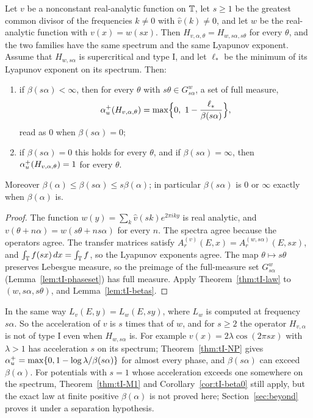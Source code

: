 \begin{theorem}[Covariance]\label{thm:tI-NP}
Let $v$ be a nonconstant real-analytic function on $\mathbb T$, let $s\ge1$ be the greatest common divisor of the frequencies $k\ne0$ with $\hat v(k)\ne0$, and let $w$ be the real-analytic function with $v(x)=w(sx)$. Then $H_{v,\alpha,\theta}=H_{w,s\alpha,s\theta}$ for every $\theta$, and the two families have the same spectrum and the same Lyapunov exponent. Assume that $H_{w,s\alpha}$ is supercritical and type I, and let $\ell_*$ be the minimum of its Lyapunov exponent on its spectrum. Then:
\begin{enumerate}
\item if $\beta(s\alpha)<\infty$, then for every $\theta$ with $s\theta\in G^w_{s\alpha}$, a set of full measure,
\[
\au(H_{v,\alpha,\theta})=\max\Bigl\{0,\ 1-\frac{\ell_*}{\beta(s\alpha)}\Bigr\},
\]
read as $0$ when $\beta(s\alpha)=0$;
\item if $\beta(s\alpha)=0$ this holds for every $\theta$, and if $\beta(s\alpha)=\infty$, then $\alpha_u^+(H_{v,\alpha,\theta})=1$ for every $\theta$.
\end{enumerate}
Moreover $\beta(\alpha)\le\beta(s\alpha)\le s\beta(\alpha)$; in particular $\beta(s\alpha)$ is $0$ or $\infty$ exactly when $\beta(\alpha)$ is.
\end{theorem}

\begin{proof}
The function $w(y)=\sum_k\hat v(sk)e^{2\pi iky}$ is real analytic, and $v(\theta+n\alpha)=w(s\theta+ns\alpha)$ for every $n$. The spectra agree because the operators agree. The transfer matrices satisfy $A^{(v)}_r(E,x)=A^{(w,s\alpha)}_r(E,sx)$, and $\int_\mathbb T f(sx)\,dx=\int_\mathbb T f$, so the Lyapunov exponents agree. The map $\theta\mapsto s\theta$ preserves Lebesgue measure, so the preimage of the full-measure set $G^w_{s\alpha}$ (Lemma~\ref{lem:tI-phaseset}) has full measure. Apply Theorem~\ref{thm:tI-law} to $(w,s\alpha,s\theta)$, and Lemma~\ref{lem:tI-betas}.
\end{proof}

\begin{remark}\label{rem:tI-acc}
In the same way $L_v(E,y)=L_w(E,sy)$, where $L_w$ is computed at frequency $s\alpha$. So the acceleration of $v$ is $s$ times that of $w$, and for $s\ge2$ the operator $H_{v,\alpha}$ is not of type I even when $H_{w,s\alpha}$ is. For example $v(x)=2\lambda\cos(2\pi sx)$ with $\lambda>1$ has acceleration $s$ on its spectrum; Theorem~\ref{thm:tI-NP} gives $\alpha_u^+=\max\{0,1-\log\lambda/\beta(s\alpha)\}$ for almost every phase, and $\beta(s\alpha)$ can exceed $\beta(\alpha)$. For potentials with $s=1$ whose acceleration exceeds one somewhere on the spectrum, Theorem~\ref{thm:tI-M1} and Corollary~\ref{cor:tI-beta0} still apply, but the exact law at finite positive $\beta(\alpha)$ is not proved here; Section~\ref{sec:beyond} proves it under a separation hypothesis.
\end{remark}
